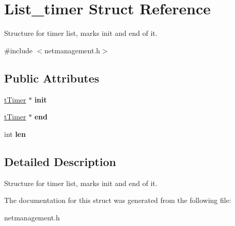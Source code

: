 \hypertarget{structList__timer}{\section{\-List\-\_\-timer \-Struct \-Reference}
\label{structList__timer}
}


\-Structure for timer list, marks init and end of it.  




{\ttfamily \#include $<$netmanagement.\-h$>$}

\subsection*{\-Public \-Attributes}
\begin{DoxyCompactItemize}
\item 
\hypertarget{structList__timer_a5179dbccae4a5461a07ff34b5a1d88c2}{\hyperlink{structTimer}{t\-Timer} $\ast$ {\bfseries init}}\label{structList__timer_a5179dbccae4a5461a07ff34b5a1d88c2}

\item 
\hypertarget{structList__timer_aeff958d950b5e7f96602af8833ce78f2}{\hyperlink{structTimer}{t\-Timer} $\ast$ {\bfseries end}}\label{structList__timer_aeff958d950b5e7f96602af8833ce78f2}

\item 
\hypertarget{structList__timer_a0e20cd57080231ae1af24837f56f762f}{int {\bfseries len}}\label{structList__timer_a0e20cd57080231ae1af24837f56f762f}

\end{DoxyCompactItemize}


\subsection{\-Detailed \-Description}
\-Structure for timer list, marks init and end of it. 

\-The documentation for this struct was generated from the following file\-:\begin{DoxyCompactItemize}
\item 
netmanagement.\-h\end{DoxyCompactItemize}
